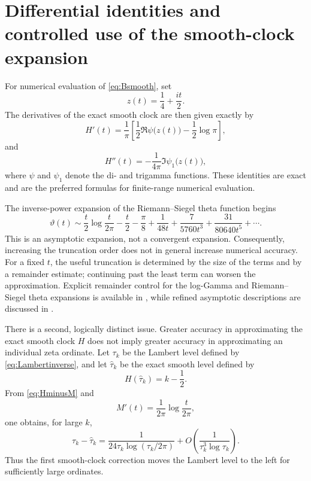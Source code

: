\documentclass[11pt]{amsart}
\numberwithin{equation}{section}
\theoremstyle{definition}
\theoremstyle{remark}
\begin{document}
\section{Differential identities and controlled use of the smooth-clock expansion}\label{sec:clock_differentials}
For numerical evaluation of \eqref{eq:Bsmooth}, set
\begin{equation}\label{eq:zt_clock}
z(t)=\frac14+\frac{it}{2}.
\end{equation}
The derivatives of the exact smooth clock are then given exactly by
\begin{equation}\label{eq:Hprime_exact}
H'(t)=\frac1\pi\left[
\frac12\Re\psi\bigl(z(t)\bigr)-\frac12\log\pi
\right],
\end{equation}
and
\begin{equation}\label{eq:Hsecond_exact}
H''(t)=-\frac1{4\pi}\Im\psi_1\bigl(z(t)\bigr),
\end{equation}
where $\psi$ and $\psi_1$ denote the di- and trigamma functions. These identities are exact and are the preferred formulas for finite-range numerical evaluation.

The inverse-power expansion of the Riemann--Siegel theta function begins
\begin{equation}\label{eq:theta_asymptotic_full}
\vartheta(t)\sim
\frac t2\log\frac{t}{2\pi}-\frac t2-\frac\pi8
+\frac1{48t}+\frac7{5760t^3}+\frac{31}{80640t^5}+\cdots.
\end{equation}
This is an asymptotic expansion, not a convergent expansion. Consequently, increasing the truncation order does not in general increase numerical accuracy. For a fixed $t$, the useful truncation is determined by the size of the terms and by a remainder estimate; continuing past the least term can worsen the approximation. Explicit remainder control for the log-Gamma and Riemann--Siegel theta expansions is available in \cite{Brent2018}, while refined asymptotic descriptions are discussed in \cite{Paris2020}.

There is a second, logically distinct issue. Greater accuracy in approximating the exact smooth clock $H$ does not imply greater accuracy in approximating an individual zeta ordinate. Let $\tau_k$ be the Lambert level defined by \eqref{eq:Lambertinverse}, and let $\widehat\tau_k$ be the exact smooth level defined by
\begin{equation}\label{eq:exact_smooth_level}
H(\widehat\tau_k)=k-\frac12.
\end{equation}
From \eqref{eq:HminusM} and
\begin{equation}\label{eq:Mprime_appendix}
M'(t)=\frac1{2\pi}\log\frac{t}{2\pi},
\end{equation}
one obtains, for large $k$,
\begin{equation}\label{eq:Lambert_exact_smooth_shift}
\tau_k-\widehat\tau_k
=\frac{1}{24\tau_k\log(\tau_k/2\pi)}
+O\!\left(\frac{1}{\tau_k^3\log\tau_k}\right).
\end{equation}
Thus the first smooth-clock correction moves the Lambert level to the left for sufficiently large ordinates.
\end{document}
